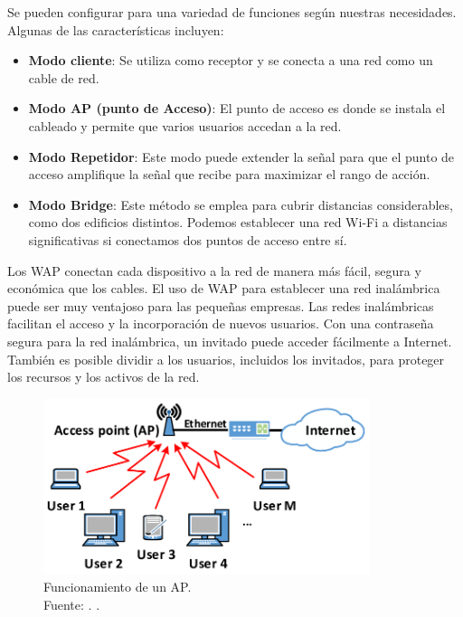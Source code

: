 Se pueden configurar para una variedad de funciones según nuestras necesidades. Algunas de las características incluyen:

\begin{itemize}
	\item \textbf{Modo cliente}: Se utiliza como receptor y se conecta a una red como un cable de red. \parencite{ot_ymant2023ap}
	\item \textbf{Modo AP (punto de Acceso)}: El punto de acceso es donde se instala el cableado y permite que varios usuarios accedan a la red. \parencite{ot_ymant2023ap}
	\item \textbf{Modo Repetidor}: Este modo puede extender la señal para que el punto de acceso amplifique la señal que recibe para maximizar el rango de acción. \parencite{ot_ymant2023ap}
	\item \textbf{Modo Bridge}: Este método se emplea para cubrir distancias considerables, como dos edificios distintos. Podemos establecer una red Wi-Fi a distancias significativas si conectamos dos puntos de acceso entre sí. \parencite{ot_ymant2023ap}
\end{itemize}

Los WAP conectan cada dispositivo a la red de manera más fácil, segura y económica que los cables. El uso de WAP para establecer una red inalámbrica puede ser muy ventajoso para las pequeñas empresas. Las redes inalámbricas facilitan el acceso y la incorporación de nuevos usuarios. Con una contraseña segura para la red inalámbrica, un invitado puede acceder fácilmente a Internet. También es posible dividir a los usuarios, incluidos los invitados, para proteger los recursos y los activos de la red. \parencite{ot_cisco2024queesap}

\begin{figure}[!ht]
	\begin{center}
		\includegraphics[width=0.85\textwidth]{2/figures/funcionap.png}
		\caption[Funcionamiento de un AP]{Funcionamiento de un AP.\\
			Fuente: \cite{ot_ymant2023ap}. .}
		\label{2:fig53}
	\end{center}
\end{figure}

